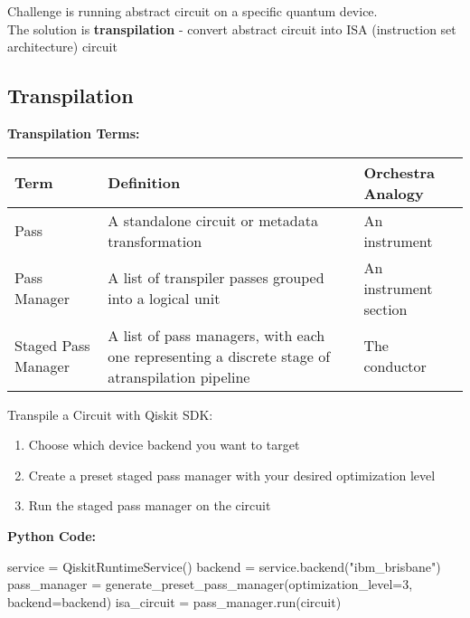 \documentclass{article}
\newcommand{\bs}{\bigskip}
\begin{document}
Challenge is running abstract circuit on a specific quantum device.\\
The solution is \textbf{transpilation} - convert abstract circuit into ISA (instruction set architecture) circuit

\subsection*{Transpilation}
\label{ss:transpile}

\textbf{Transpilation Terms:}\\
\begin{tabularx}{\textwidth}{ | >{\hsize}Y | Y | >{\hsize}Y | }
    \hline
    Term & Definition & Orchestra Analogy \\
    \hline
    Pass & A standalone circuit or metadata transformation & An instrument \\
    \hline
    Pass Manager & A list of transpiler passes grouped into a logical unit & An instrument section \\
    \hline
    Staged Pass Manager & A list of pass managers, with each one representing a discrete stage of atranspilation pipeline & The conductor \\
    \hline
\end{tabularx}\bs

Transpile a Circuit with Qiskit SDK:
\begin{enumerate}
\item  Choose which device backend you want to target
\item  Create a preset staged pass manager with your desired optimization level
\item  Run the staged pass manager on the circuit
\end{enumerate}

\textbf{Python Code:}

\begin{python}
service = QiskitRuntimeService()  
backend = service.backend("ibm_brisbane")  
pass_manager = generate_preset_pass_manager(optimization_level=3, backend=backend)  
isa_circuit = pass_manager.run(circuit)
\end{python}
\end{document}
